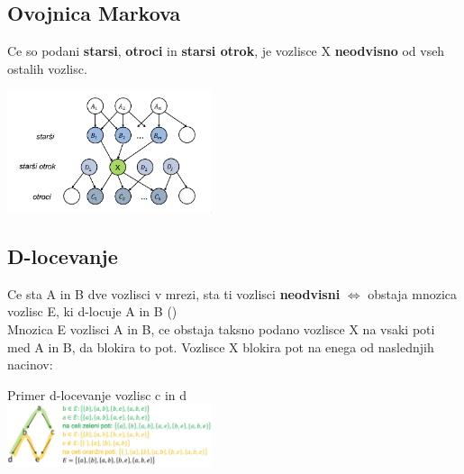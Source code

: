 \subsection{Ovojnica Markova}
Ce so podani \textbf{starsi}, \textbf{otroci} in \textbf{starsi otrok}, je vozlisce X \textbf{neodvisno} od vseh ostalih vozlisc.

\includegraphics[width=6cm]{images/ovojnica-markova.png}

\subsection{D-locevanje}
Ce sta A in B dve vozlisci v mrezi, sta ti vozlisci \textbf{neodvisni} $\Leftrightarrow$ obstaja mnozica vozlisc E, ki d-locuje A in B ()\\
Mnozica E  vozlisci A in B, ce obstaja taksno podano vozlisce X na vsaki poti med A in B, da blokira to pot. Vozlisce X blokira pot
na enega od naslednjih nacinov:

Primer d-locevanje vozlisc c in d\\
\includegraphics*[width=6cm]{images/primer-d-locevanje.png}